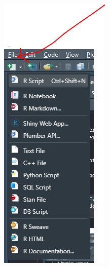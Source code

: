 \documentclass[
]{book}
\begin{document}
\includegraphics[width=1\linewidth]{images/script}
\end{document}
